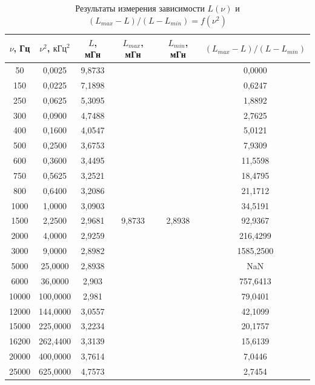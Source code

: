\documentclass[a4paper, 12pt]{article}
\begin{document}
    \begin{table}[H]
        \centering
        \begin{tabular}{|c|c|c|c|c|c|}
        \hline
        $\nu$, Гц & $\nu^2$, $\text{кГц}^2$ & $L$, мГн & $L_{max}$, мГн &$L_{min}$, мГн & $(L_{max} - L) / (L - L_{min})$ \\ \hline
        50 & 0,0025 & 9,8733 & \multirow{21}{*}{9,8733} & \multirow{21}{*}{2,8938} & 0,0000 \\ \cline{1-3} \cline{6-6} 
        150 & 0,0225 & 7,1898 &  &  & 0,6247 \\ \cline{1-3} \cline{6-6} 
        250 & 0,0625 & 5,3095 &  &  & 1,8892 \\ \cline{1-3} \cline{6-6} 
        300 & 0,0900 & 4,7488 &  &  & 2,7625 \\ \cline{1-3} \cline{6-6} 
        400 & 0,1600 & 4,0547 &  &  & 5,0121 \\ \cline{1-3} \cline{6-6} 
        500 & 0,2500 & 3,6753 &  &  & 7,9309 \\ \cline{1-3} \cline{6-6} 
        600 & 0,3600 & 3,4495 &  &  & 11,5598 \\ \cline{1-3} \cline{6-6} 
        750 & 0,5625 & 3,2521 &  &  & 18,4795 \\ \cline{1-3} \cline{6-6} 
        800 & 0,6400 & 3,2086 &  &  & 21,1712 \\ \cline{1-3} \cline{6-6} 
        1000 & 1,0000 & 3,0903 &  &  & 34,5191 \\ \cline{1-3} \cline{6-6} 
        1500 & 2,2500 & 2,9681 &  &  & 92,9367 \\ \cline{1-3} \cline{6-6} 
        2000 & 4,0000 & 2,9259 &  &  & 216,4299 \\ \cline{1-3} \cline{6-6} 
        3000 & 9,0000 & 2,8982 &  &  & 1585,2500 \\ \cline{1-3} \cline{6-6} 
        5000 & 25,0000 & 2,8938 &  &  & NaN \\ \cline{1-3} \cline{6-6} 
        6000 & 36,0000 & 2,903 &  &  & 757,6413 \\ \cline{1-3} \cline{6-6} 
        10000 & 100,0000 & 2,981 &  &  & 79,0401 \\ \cline{1-3} \cline{6-6} 
        12000 & 144,0000 & 3,0557 &  &  & 42,1099 \\ \cline{1-3} \cline{6-6} 
        15000 & 225,0000 & 3,2234 &  &  & 20,1757 \\ \cline{1-3} \cline{6-6} 
        16200 & 262,4400 & 3,3139 &  &  & 15,6139 \\ \cline{1-3} \cline{6-6} 
        20000 & 400,0000 & 3,7614 &  &  & 7,0446 \\ \cline{1-3} \cline{6-6} 
        25000 & 625,0000 & 4,7573 &  &  & 2,7454 \\ \hline
        \end{tabular}
        \caption{Результаты измерения зависимости $L(\nu)$ и $(L_{max} - L) / (L - L_{min}) = f(\nu^2)$}
        \label{table:inductivity}
    \end{table}
\end{document}
